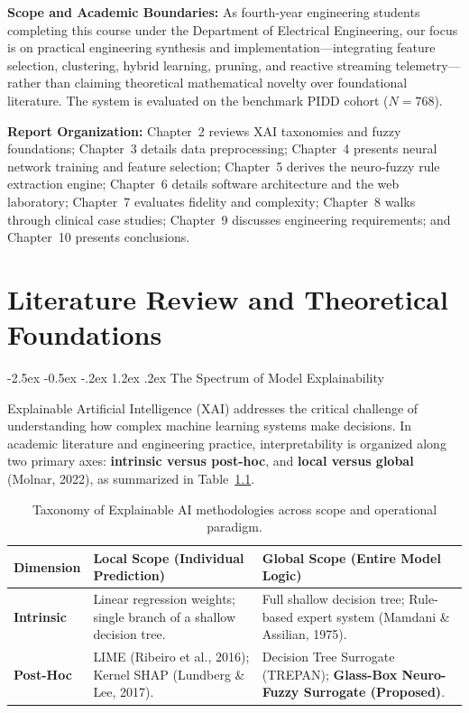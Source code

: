 \documentclass[12pt,a4paper,oneside]{report}
\makeatletter
\renewcommand\section{\@startsection {section}{1}{\z@}%
                                   {-2.5ex \@plus -0.5ex \@minus -.2ex}%
                                   {1.2ex \@plus .2ex}%
                                   {\normalfont\fontsize{13}{16}\selectfont\bfseries}}
\makeatother
\begin{document}
\textbf{Scope and Academic Boundaries:} As fourth-year engineering students completing this course under the Department of Electrical Engineering, our focus is on practical engineering synthesis and implementation—integrating feature selection, clustering, hybrid learning, pruning, and reactive streaming telemetry—rather than claiming theoretical mathematical novelty over foundational literature. The system is evaluated on the benchmark PIDD cohort ($N=768$).

\textbf{Report Organization:} Chapter~2 reviews XAI taxonomies and fuzzy foundations; Chapter~3 details data preprocessing; Chapter~4 presents neural network training and feature selection; Chapter~5 derives the neuro-fuzzy rule extraction engine; Chapter~6 details software architecture and the web laboratory; Chapter~7 evaluates fidelity and complexity; Chapter~8 walks through clinical case studies; Chapter~9 discusses engineering requirements; and Chapter~10 presents conclusions.


\chapter{Literature Review and Theoretical Foundations}

\section{The Spectrum of Model Explainability}

Explainable Artificial Intelligence (XAI) addresses the critical challenge of understanding how complex machine learning systems make decisions. In academic literature and engineering practice, interpretability is organized along two primary axes: \textbf{intrinsic versus post-hoc}, and \textbf{local versus global} (Molnar, 2022), as summarized in Table~\ref{tab:xai_taxonomy}.

\begin{table}[htbp]
    \centering
    \footnotesize
    \renewcommand{\arraystretch}{0.85}
    \begin{tabularx}{\textwidth}{l X X}
    \toprule
    \textbf{Dimension} & \textbf{Local Scope (Individual Prediction)} & \textbf{Global Scope (Entire Model Logic)} \\
    \midrule
    \textbf{Intrinsic} & Linear regression weights; single branch of a shallow decision tree. & Full shallow decision tree; Rule-based expert system (Mamdani \& Assilian, 1975). \\
    \midrule
    \textbf{Post-Hoc} & LIME (Ribeiro et al., 2016); Kernel SHAP (Lundberg \& Lee, 2017). & Decision Tree Surrogate (TREPAN); \textbf{Glass-Box Neuro-Fuzzy Surrogate (Proposed)}. \\
    \bottomrule
    \end{tabularx}
    \caption[Taxonomy of Explainable AI Methodologies]{Taxonomy of Explainable AI methodologies across scope and operational paradigm.}
    \label{tab:xai_taxonomy}
\end{table}
\end{document}

